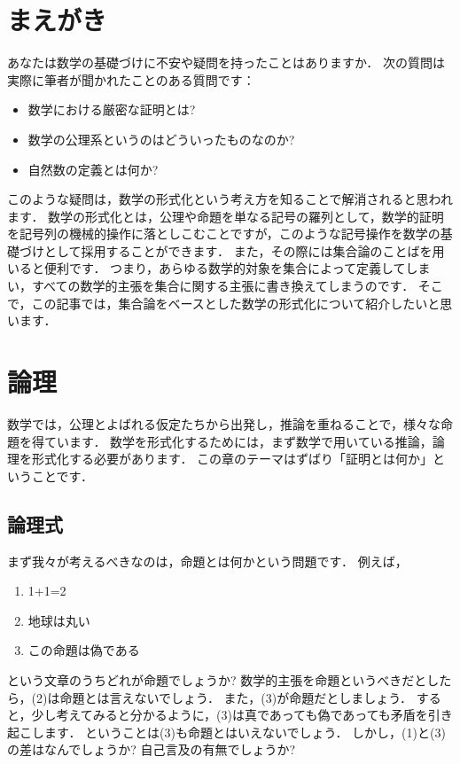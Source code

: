\documentclass[./main]{subfiles}
\begin{document}

\section{まえがき}

あなたは数学の基礎づけに不安や疑問を持ったことはありますか．
次の質問は実際に筆者が聞かれたことのある質問です：
\begin{itemize}
\item 数学における厳密な証明とは?
\item 数学の公理系というのはどういったものなのか?
\item 自然数の定義とは何か?
\end{itemize}
このような疑問は，数学の形式化という考え方を知ることで解消されると思われます．
数学の形式化とは，公理や命題を単なる記号の羅列として，数学的証明を記号列の機械的操作に落としこむことですが，このような記号操作を数学の基礎づけとして採用することができます．
また，その際には集合論のことばを用いると便利です．
つまり，あらゆる数学的対象を集合によって定義してしまい，すべての数学的主張を集合に関する主張に書き換えてしまうのです．
そこで，この記事では，集合論をベースとした数学の形式化について紹介したいと思います．

\section{論理}

数学では，公理とよばれる仮定たちから出発し，推論を重ねることで，様々な命題を得ています．
数学を形式化するためには，まず数学で用いている推論，論理を形式化する必要があります．
この章のテーマはずばり「証明とは何か」ということです．

\subsection{論理式}

まず我々が考えるべきなのは，命題とは何かという問題です．
例えば，
\begin{enumerate}
\item 1+1=2
\item 地球は丸い
\item この命題は偽である
\end{enumerate}
という文章のうちどれが命題でしょうか?
数学的主張を命題というべきだとしたら，(2)は命題とは言えないでしょう．
また，(3)が命題だとしましょう．
すると，少し考えてみると分かるように，(3)は真であっても偽であっても矛盾を引き起こします．
ということは(3)も命題とはいえないでしょう．
しかし，(1)と(3)の差はなんでしょうか?
自己言及の有無でしょうか?
\end{document}
